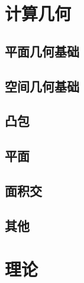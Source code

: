 \documentclass[12pt,a4paper,titlepage]{article}
\begin{document}
\section{\LARGE 计算几何}
	\subsection{平面几何基础}
    
    
    
    
    

	\subsection{空间几何基础}
    

	\subsection{凸包}
	
	
	
	
	

	\subsection{平面}
	
	
	
	
	

	\subsection{面积交}
	
	
	
	

	\subsection{其他}

\section{\LARGE 理论}
\end{document}
